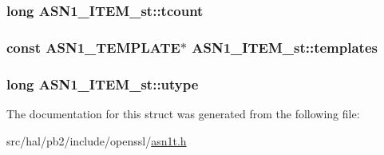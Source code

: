 \subsubsection[{\texorpdfstring{tcount}{tcount}}]{\setlength{\rightskip}{0pt plus 5cm}long A\+S\+N1\+\_\+\+I\+T\+E\+M\+\_\+st\+::tcount}\hypertarget{struct_a_s_n1___i_t_e_m__st_a52bce8167464f68b77aeeabf7b8c26d9}{}\label{struct_a_s_n1___i_t_e_m__st_a52bce8167464f68b77aeeabf7b8c26d9}
\subsubsection[{\texorpdfstring{templates}{templates}}]{\setlength{\rightskip}{0pt plus 5cm}const {\bf A\+S\+N1\+\_\+\+T\+E\+M\+P\+L\+A\+TE}$\ast$ A\+S\+N1\+\_\+\+I\+T\+E\+M\+\_\+st\+::templates}\hypertarget{struct_a_s_n1___i_t_e_m__st_a63735dc5d18e7f66b3071f4ca76e8462}{}\label{struct_a_s_n1___i_t_e_m__st_a63735dc5d18e7f66b3071f4ca76e8462}
\subsubsection[{\texorpdfstring{utype}{utype}}]{\setlength{\rightskip}{0pt plus 5cm}long A\+S\+N1\+\_\+\+I\+T\+E\+M\+\_\+st\+::utype}\hypertarget{struct_a_s_n1___i_t_e_m__st_a49602e67011b80d23622751f6ce154f5}{}\label{struct_a_s_n1___i_t_e_m__st_a49602e67011b80d23622751f6ce154f5}


The documentation for this struct was generated from the following file\+:\begin{DoxyCompactItemize}
\item 
src/hal/pb2/include/openssl/\hyperlink{asn1t_8h}{asn1t.\+h}\end{DoxyCompactItemize}
